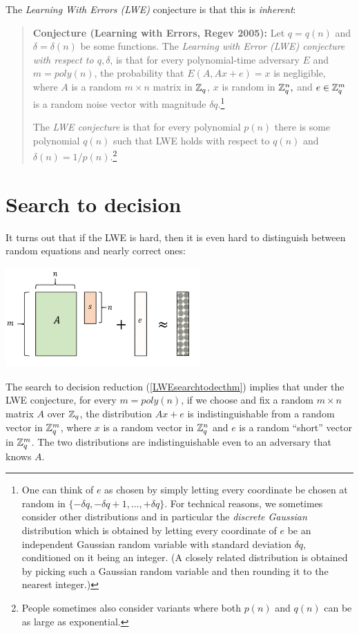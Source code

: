 The \emph{Learning With Errors (LWE)} conjecture is that this is
\emph{inherent}:

\begin{quote}
\textbf{Conjecture (Learning with Errors, Regev 2005):} Let \(q=q(n)\)
and \(\delta=\delta(n)\) be some functions. The \emph{Learning with
Error (LWE) conjecture with respect to \(q,\delta\)}, is that for every
polynomial-time adversary \(E\) and \(m=poly(n)\), the probability that
\(E(A,Ax+e)=x\) is negligible, where \(A\) is a random \(m\times n\)
matrix in \({\mathbb{Z}}_q\), \(x\) is random in \({\mathbb{Z}}_q^n,\) and \(e \in {\mathbb{Z}}_q^m\)
is a random noise vector with magnitude \(\delta q\).\footnote{One can
  think of \(e\) as chosen by simply letting every coordinate be chosen
  at random in \(\{ -\delta q, -\delta q + 1 , \ldots, +\delta q \}\).
  For technical reasons, we sometimes consider other distributions and
  in particular the \emph{discrete Gaussian} distribution which is
  obtained by letting every coordinate of \(e\) be an independent
  Gaussian random variable with standard deviation \(\delta q\),
  conditioned on it being an integer. (A closely related distribution is
  obtained by picking such a Gaussian random variable and then rounding
  it to the nearest integer.)}

The \emph{LWE conjecture} is that for every polynomial \(p(n)\) there is
some polynomial \(q(n)\) such that LWE holds with respect to \(q(n)\)
and \(\delta(n)=1/p(n)\).\footnote{People sometimes also consider
  variants where both \(p(n)\) and \(q(n)\) can be as large as
  exponential.}
\end{quote}

\section{Search to decision}\label{Search-to-decision}

It turns out that if the LWE is hard, then it is even hard to
distinguish between random equations and nearly correct ones:


\begin{marginfigure}
\centering
\includegraphics[width=\linewidth, height=1.5in, keepaspectratio]{../figure/lwevecindist.png}
\caption{The search to decision reduction (\cref{LWEsearchtodecthm})
implies that under the LWE conjecture, for every \(m=poly(n)\), if we
choose and fix a random \(m\times n\) matrix \(A\) over \({\mathbb{Z}}_q\), the
distribution \(Ax+e\) is indistinguishable from a random vector in
\({\mathbb{Z}}_q^m\), where \(x\) is a random vector in \({\mathbb{Z}}_q^n\) and \(e\) is a
random ``short'' vector in \({\mathbb{Z}}_q^m\). The two distributions are
indistinguishable even to an adversary that knows \(A\).}
\label{figid}
\end{marginfigure}

